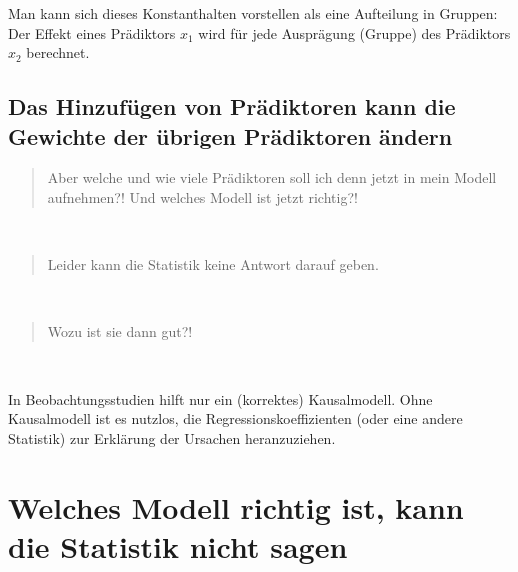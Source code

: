 \documentclass[
  a4paper,
  DIV=11]{scrreprt}
\theoremstyle{definition}
\theoremstyle{remark}
\begin{document}
Man kann sich dieses Konstanthalten vorstellen als eine Aufteilung in
Gruppen: Der Effekt eines Prädiktors \(x_1\) wird für jede Ausprägung
(Gruppe) des Prädiktors \(x_2\) berechnet.

\hypertarget{das-hinzufuxfcgen-von-pruxe4diktoren-kann-die-gewichte-der-uxfcbrigen-pruxe4diktoren-uxe4ndern}{%
\subsection{Das Hinzufügen von Prädiktoren kann die Gewichte der übrigen
Prädiktoren
ändern}\label{das-hinzufuxfcgen-von-pruxe4diktoren-kann-die-gewichte-der-uxfcbrigen-pruxe4diktoren-uxe4ndern}}

\begin{quote}
Aber welche und wie viele Prädiktoren soll ich denn jetzt in mein Modell
aufnehmen?! Und welches Modell ist jetzt richtig?!
\end{quote}

🧑

\begin{quote}
Leider kann die Statistik keine Antwort darauf geben.
\end{quote}

👩

\begin{quote}
Wozu ist sie dann gut?!
\end{quote}

🧑

\begin{tcolorbox}[enhanced jigsaw, colframe=quarto-callout-important-color-frame, title=\textcolor{quarto-callout-important-color}{\faExclamation}\hspace{0.5em}{Wichtig}, breakable, leftrule=.75mm, coltitle=black, toptitle=1mm, bottomrule=.15mm, bottomtitle=1mm, opacityback=0, arc=.35mm, rightrule=.15mm, left=2mm, colbacktitle=quarto-callout-important-color!10!white, opacitybacktitle=0.6, toprule=.15mm, titlerule=0mm, colback=white]
In Beobachtungsstudien hilft nur ein (korrektes) Kausalmodell. Ohne
Kausalmodell ist es nutzlos, die Regressionskoeffizienten (oder eine
andere Statistik) zur Erklärung der Ursachen heranzuziehen.
\end{tcolorbox}

\hypertarget{welches-modell-richtig-ist-kann-die-statistik-nicht-sagen}{%
\section{Welches Modell richtig ist, kann die Statistik nicht
sagen}\label{welches-modell-richtig-ist-kann-die-statistik-nicht-sagen}}
\end{document}
